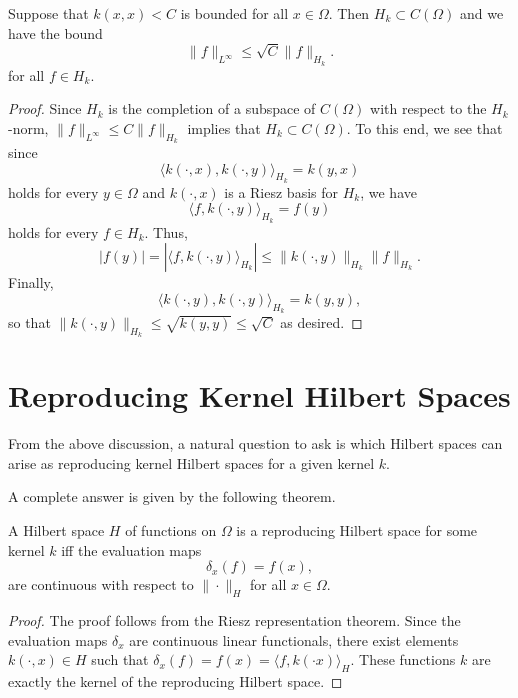 \begin{lemma}
 Suppose that $k(x,x) < C$ is bounded for all $x\in \Omega$. Then $H_k\subset C(\Omega)$ and we have the bound
 \begin{equation}
  \|f\|_{L^\infty} \leq \sqrt{C}\|f\|_{H_k}.
 \end{equation}
 for all $f\in H_k$.

\end{lemma}
\begin{proof}
 Since $H_k$ is the completion of a subspace of $C(\Omega)$ with respect to the $H_k$-norm, $\|f\|_{L^\infty} \leq C\|f\|_{H_k}$ implies that $H_k\subset C(\Omega)$. To this end, we see that since
 \begin{equation}
  \langle k(\cdot, x), k(\cdot, y)\rangle_{H_k} = k(y,x)
 \end{equation}
 holds for every $y\in \Omega$ and $k(\cdot, x)$ is a Riesz basis for $H_k$, we have
 \begin{equation}
  \langle f, k(\cdot, y)\rangle_{H_k} = f(y)
 \end{equation}
 holds for every $f\in H_k$. Thus,
 \begin{equation}
  |f(y)| = |\langle f, k(\cdot, y)\rangle_{H_k}| \leq \|k(\cdot, y)\|_{H_k}\|f\|_{H_k}.
 \end{equation}
 Finally,
 \begin{equation}
  \langle k(\cdot, y),k(\cdot, y)\rangle_{H_k} = k(y,y),
 \end{equation}
 so that $\|k(\cdot, y)\|_{H_k} \leq \sqrt{k(y,y)} \leq \sqrt{C}$ as desired.


\end{proof}

\section{Reproducing Kernel Hilbert Spaces}
From the above discussion, a natural question to ask is which Hilbert spaces can arise as reproducing kernel Hilbert spaces for a given kernel $k$.

A complete answer is given by the following theorem.

\begin{theorem}
 A Hilbert space $H$ of functions on $\Omega$ is a reproducing Hilbert space for some kernel $k$ iff the evaluation maps
 \begin{equation}
  \delta_x(f) = f(x),
 \end{equation}
 are continuous with respect to $\|\cdot\|_H$ for all $x\in \Omega$.

\end{theorem}
\begin{proof}
 The proof follows from the Riesz representation theorem. Since the evaluation maps $\delta_x$ are continuous linear functionals, there exist elements $k(\cdot, x)\in H$ such that $\delta_x(f) = f(x) = \langle f, k(\cdot x)\rangle_H$. These functions $k$ are exactly the kernel of the reproducing Hilbert space.
\end{proof}

